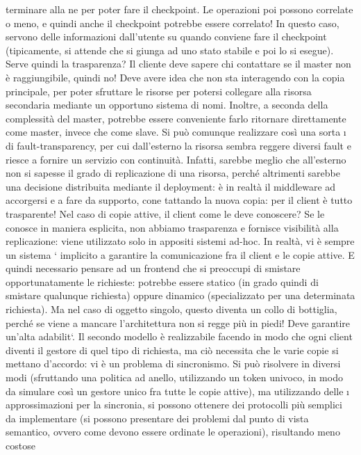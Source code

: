 terminare alla ne per poter fare il checkpoint.
Le operazioni poi possono correlate o meno, e quindi anche il checkpoint
potrebbe essere correlato! In questo caso, servono delle informazioni dall'utente
su quando conviene fare il checkpoint (tipicamente, si attende che si giunga ad
uno stato stabile e poi lo si esegue).
Serve quindi la trasparenza? Il cliente deve sapere chi contattare se il master
non è raggiungibile, quindi no! Deve avere idea che non sta interagendo con la
copia principale, per poter sfruttare le risorse per potersi collegare alla risorsa
secondaria mediante un opportuno sistema di nomi. Inoltre, a seconda della
complessità del master, potrebbe essere conveniente farlo ritornare direttamente
come master, invece che come slave. Si può comunque realizzare così una sorta
\i{}
di fault-transparency, per cui dall'esterno la risorsa sembra reggere diversi fault
e riesce a fornire un servizio con continuità.
Infatti, sarebbe meglio che all'esterno non si sapesse il grado di replicazione
di una risorsa, perché altrimenti sarebbe una decisione distribuita mediante il
deployment: è in realtà il middleware ad accorgersi e a fare da supporto, cone
tattando la nuova copia: per il client è tutto trasparente!
Nel caso di copie attive, il client come le deve conoscere? Se le conosce in
maniera esplicita, non abbiamo trasparenza e fornisce visibilità alla replicazione:
viene utilizzato solo in appositi sistemi ad-hoc. In realtà, vi è sempre un sistema
`
implicito a garantire la comunicazione fra il client e le copie attive. E quindi necessario pensare ad un frontend che
si preoccupi di smistare opportunatamente le
richieste: potrebbe essere statico (in grado quindi di smistare qualunque richiesta) oppure dinamico (specializzato per
una determinata richiesta). Ma nel caso
di oggetto singolo, questo diventa un collo di bottiglia, perché se viene a mancare
l'architettura non si regge più in piedi! Deve garantire un'alta adabilit`.
Il secondo modello è realizzabile facendo in modo che ogni client diventi il
gestore di quel tipo di richiesta, ma ciò necessita che le varie copie si mettano
d'accordo: vi è un problema di sincronismo. Si può risolvere in diversi modi
(sfruttando una politica ad anello, utilizzando un token univoco, in modo da
simulare così un gestore unico fra tutte le copie attive), ma utilizzando delle
\i{}
approssimazioni per la sincronia, si possono ottenere dei protocolli più semplici
da implementare (si possono presentare dei problemi dal punto di vista semantico, ovvero come devono essere ordinate le
operazioni), risultando meno costose
